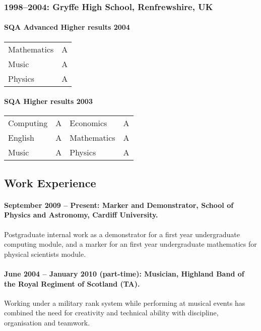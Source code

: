 \documentclass{article}
\begin{document}
\subsubsection*{1998--2004: Gryffe High School, Renfrewshire, UK}
\begin{minipage}{3in}
\paragraph{SQA Advanced Higher results 2004}
\begin{center}
\begin{tabular}{ll}
Mathematics & A\\
Music & A\\
Physics & A \\
\end{tabular}
\end{center}
\end{minipage}
\begin{minipage}{3in}
\paragraph{SQA Higher results 2003}
\begin{center}
\begin{tabular}{llll}
Computing & A & Economics & A \\
English & A & Mathematics & A \\
Music & A & Physics & A
\end{tabular}
\end{center}
\end{minipage}

\subsection*{Work Experience}
\paragraph{September 2009 -- Present: Marker and Demonstrator, School of Physics and Astronomy, Cardiff University.} Postgraduate internal work as a demonstrator for a first year undergraduate computing module, and a marker for an first year undergraduate mathematics for physical scientists module.

\paragraph{June 2004 -- January 2010 (part-time): Musician, Highland Band of the Royal Regiment
of Scotland (TA).} Working under a military rank system while
performing at musical events has combined the need for creativity
and technical ability with discipline, organisation and teamwork.
\end{document}
